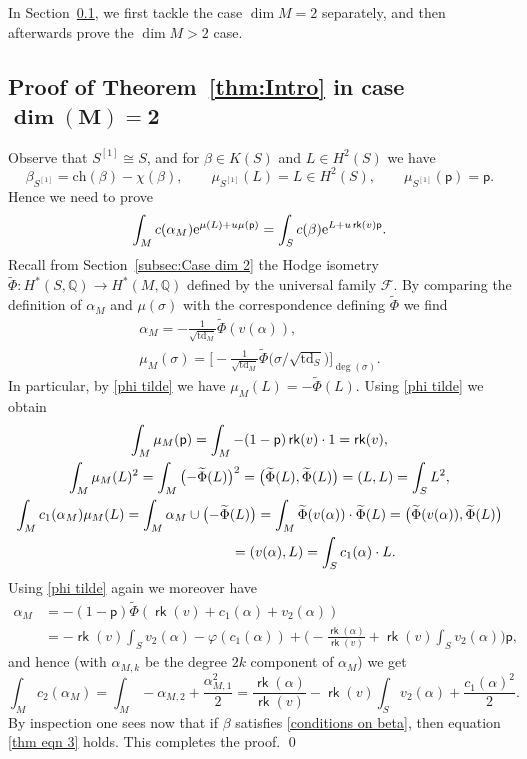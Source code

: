 \documentclass[pdftex]{sigma}
\numberwithin{equation}{section}
\newcommand{\BQ}{{\mathbb{Q}}}
\newcommand{\CF}{{\mathcal F}}
\newcommand{\pt}{{\mathsf{p}}}
\newcommand{\ch}{{\mathrm{ch}}}
\newcommand{\td}{{\mathrm{td}}}
\newcommand{\1}{\mathsf{1}}
\newcommand\rk{\operatorname{\mathsf{rk}}}
\begin{document}
In Section~\ref{subsec:GK conjecture dim 2}, we first tackle the case $\dim M = 2$ separately,
and then afterwards prove the $\dim M > 2$ case.

\subsection[Proof of Theorem~1.2 in case dim(M)=2]
{Proof of Theorem~\ref{thm:Intro} in case $\boldsymbol{\dim(M)=2}$}\label{subsec:GK conjecture dim 2}
Observe that $S^{[1]} \cong S$, and for $\beta \in K(S)$ and $L \in H^2(S)$ we have
\[
\beta_{S^{[1]}} = \ch(\beta) - \chi(\beta), \qquad
\mu_{S^{[1]}}(L) = L \in H^2(S), \qquad
\mu_{S^{[1]}}(\pt) = \pt.
\]
Hence we need to prove
\begin{equation}
\label{thm eqn 3}
\int_{M} c(\alpha_M) {\rm e}^{\mu(L) + u \mu(\pt)}
=
\int_{S} c(\beta) {\rm e}^{L + u \rk(v) \pt}.
\end{equation}
Recall from Section~\ref{subsec:Case dim 2} the Hodge isometry $\widetilde{\Phi} \colon H^{\ast}(S,\BQ) \to H^{\ast}(M,\BQ)$ defined by the universal family $\CF$.
By comparing the definition of $\alpha_M$ and $\mu(\sigma)$ with the correspondence defining $\widetilde{\Phi}$ we find
\begin{gather*}
\alpha_M  = -\frac{1}{\sqrt{\td_M}} \widetilde{\Phi}(v(\alpha)),
\\
\mu_M(\sigma)  = \biggl[ - \frac{1}{\sqrt{\td_M}} \widetilde{\Phi}\big(\sigma/\sqrt{\td_S}\big) \biggr]_{\deg(\sigma)}.
\end{gather*}
In particular, by \eqref{phi tilde} we have $\mu_M(L) = -\widetilde{\Phi}(L)$.
Using \eqref{phi tilde} we obtain
\begin{gather*}
\int_{M} \mu_M(\pt) = \int_{M} -(1-\pt) \rk(v) \cdot 1 = \rk(v),
\\
\int_M \mu_M(L)^2 = \int_{M} \big({-} \widetilde{\Phi}(L)\big)^2 = \big(\widetilde{\Phi}(L), \widetilde{\Phi}(L)\big) = (L,L) = \int_S L^2,
\\
\int_{M} c_1(\alpha_M) \mu_M(L) = \int_{M} \alpha_M \cup \big({-} \widetilde{\Phi}(L)\big) = \int_{M} \widetilde{\Phi}(v(\alpha)) \cdot \widetilde{\Phi}(L)= \big(\widetilde{\Phi}(v(\alpha)), \widetilde{\Phi}(L)\big)
\\ \hphantom{\int_{M} c_1(\alpha_M) \mu_M(L)}
{} = (v(\alpha), L)= \int_{S} c_1(\alpha) \cdot L.
\end{gather*}
Using \eqref{phi tilde} again we moreover have
\begin{align*}
\alpha_M &= -(1-\pt) \widetilde{\Phi}( \rk(v) + c_1(\alpha) + v_2(\alpha) )
\\
&= - \rk(v) \int_{S} v_2(\alpha) - \varphi(c_1(\alpha)) + \biggl( - \frac{\rk(\alpha)}{\rk(v)} + \rk(v) \int_S v_2(\alpha) \biggr) \pt,
\end{align*}
and hence (with $\alpha_{M,k}$ be the degree $2k$ component of $\alpha_M$) we get
\[ \int_{M} c_2(\alpha_M) = \int_{M} - \alpha_{M,2} + \frac{\alpha_{M,1}^2}{2} = \frac{\rk(\alpha)}{\rk(v)} - \rk(v) \int_S v_2(\alpha) + \frac{c_1(\alpha)^2}{2}. \]
By inspection one sees now that if $\beta$ satisfies \eqref{conditions on beta},
then equation \eqref{thm eqn 3} holds.
This completes the proof. \qed
\end{document}
